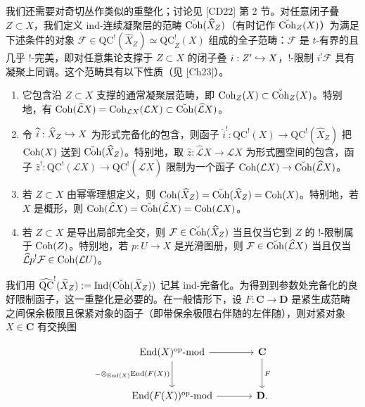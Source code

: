 我们还需要对奇切丛作类似的重整化；讨论见 [CD22] 第 2 节。对任意闭子叠 $Z\subset X$，我们定义 ind-连续凝聚层的范畴 $\breve{\operatorname{Coh}}(\widehat X_Z)$（有时记作 $\breve{\operatorname{Coh}}_Z(X)$）为满足下述条件的对象 $\mathcal F\in\mathrm{QC}^{!}(\widehat X_Z)\simeq\mathrm{QC}^{!}_Z(X)$ 组成的全子范畴：$\mathcal F$ 是 $t$-有界的且几乎 $!$-完美，即对任意集论支撑于 $Z\subset X$ 的闭子叠 $i:Z'\hookrightarrow X$，$!$-限制 $i^{!}\mathcal F$ 具有凝聚上同调。这个范畴具有以下性质（见 [Ch23]）。
\begin{enumerate}[(1)]
\item 它包含沿 $Z\subset X$ 支撑的通常凝聚层范畴，即 $\operatorname{Coh}_Z(X)\subset\breve{\operatorname{Coh}}_Z(X)$。特别地，有 $\operatorname{Coh}(\widehat{\mathcal L}X)=\operatorname{Coh}_{\mathcal L X}(\mathcal L X)\subset\breve{\operatorname{Coh}}(\widehat{\mathcal L}X)$。
\item 令 $\widehat i:\widehat X_Z\hookrightarrow X$ 为形式完备化的包含，则函子 $\widehat i^{!}:\mathrm{QC}^{!}(X)\to\mathrm{QC}^{!}(\widehat X_Z)$ 把 $\operatorname{Coh}(X)$ 送到 $\breve{\operatorname{Coh}}(\widehat X_Z)$。特别地，取 $\widehat z:\widehat{\mathcal L}X\to\mathcal L X$ 为形式圈空间的包含，函子 $\widehat z^{!}:\mathrm{QC}^{!}(\mathcal L X)\to\mathrm{QC}^{!}(\widehat{\mathcal L}X)$ 限制为一个函子 $\operatorname{Coh}(\mathcal L X)\to\breve{\operatorname{Coh}}(\widehat{\mathcal L}X)$。
\item 若 $Z\subset X$ 由幂零理想定义，则 $\operatorname{Coh}(\widehat X_Z)=\breve{\operatorname{Coh}}(\widehat X_Z)=\operatorname{Coh}(X)$。特别地，若 $X$ 是概形，则 $\operatorname{Coh}(\widehat{\mathcal L}X)=\breve{\operatorname{Coh}}(\widehat{\mathcal L}X)=\operatorname{Coh}(\mathcal L X)$。
\item 若 $Z\subset X$ 是导出局部完全交，则 $\mathcal F\in\breve{\operatorname{Coh}}(\widehat X_Z)$ 当且仅当它到 $Z$ 的 $!$-限制属于 $\operatorname{Coh}(Z)$。特别地，若 $p:U\to X$ 是光滑图册，则 $\mathcal F\in\breve{\operatorname{Coh}}(\widehat{\mathcal L}X)$ 当且仅当 $\widehat{\mathcal L}p^{!}\mathcal F\in\operatorname{Coh}(\mathcal L U)$。
\end{enumerate}

我们用 $\widehat{\mathrm{QC}}^{!}(\widehat X_Z):=\operatorname{Ind}(\breve{\operatorname{Coh}}(\widehat X_Z))$ 记其 ind-完备化。为得到到参数处完备化的良好限制函子，这一重整化是必要的。在一般情形下，设 $F:\mathbf C\to\mathbf D$ 是紧生成范畴之间保余极限且保紧对象的函子（即带保余极限右伴随的左伴随），则对紧对象 $X\in\mathbf C$ 有交换图


\[
\begin{tikzcd}[column sep=large,row sep=large]
\End(X)^{\mathrm{op}}\text{-}\mathrm{mod} \arrow[r] \arrow[d, "-\otimes_{\End(X)}\End(F(X))"'] & \mathbf C \arrow[d, "F"]\\
\End(F(X))^{\mathrm{op}}\text{-}\mathrm{mod} \arrow[r] & \mathbf D.
\end{tikzcd}
\]

